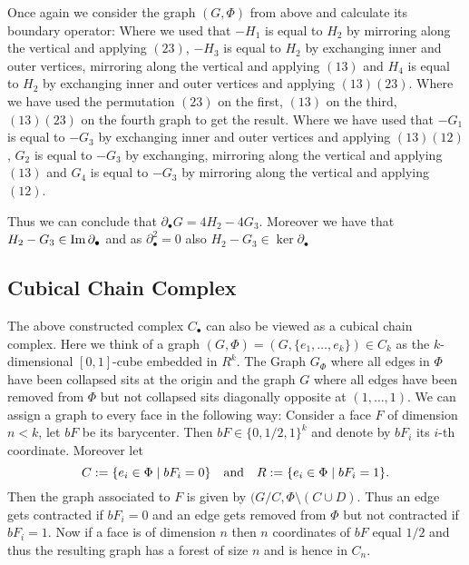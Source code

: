 \begin{eg}
	Once again we consider the graph $(G,\Phi)$ from above and calculate its boundary operator:
	Where we used that $-H_{1}$ is equal to $H_{2}$ by mirroring along the vertical and applying $(2 3)$,
	$-H_{3}$ is equal to $H_2$ by exchanging inner and outer vertices, mirroring along the vertical and applying $(1 3)$ and
	$H_{4}$ is equal to $H_{2}$ by exchanging inner and outer vertices and applying $(1 3)(2 3)$.
	Where we have used the permutation $(2 3)$ on the first,  $(1 3)$ on the third, $(1 3)(2 3)$ on the fourth graph to get the result.
	Where we have used that $-G_{1}$ is equal to $-G_{3}$ by exchanging inner and outer vertices and applying $(1 3)(1 2)$,
	$G_{2}$ is equal to $-G_{3}$ by exchanging, mirroring along the vertical and applying $(1 3)$ and
	$G_{4}$ is equal to $-G_{3}$ by mirroring along the vertical and applying $(1 2)$. 

	Thus we can conclude that $\partial_{\bullet} G = 4 H_2 - 4 G_3$. Moreover we have that $H_2 - G_3 \in \operatorname{Im} \partial_{\bullet}$ and 
	as $\partial_{\bullet}^2=0$ also $H_2 - G_3 \in \ker \partial_{\bullet}$
\end{eg}

\subsection{Cubical Chain Complex}
The above constructed complex $C_{\bullet}$ can also be viewed as a cubical chain complex.
Here we think of a graph $(G,\Phi) = (G, \{e_1,\ldots,e_{k}\})  \in C_{k}$ as the $k$-dimensional $[0,1]$-cube embedded in $R^{k}$.
The Graph $G_{\Phi}$ where all edges in  $\Phi$ have been collapsed sits at the origin and the graph $G$ where all edges have been removed from  $\Phi$ but not collapsed
sits diagonally opposite at  $(1,\ldots,1)$.
We can assign a graph to every face in the following way:
Consider a face $F$ of dimension $n < k$, let $bF$ be its barycenter. Then $bF \in \{0,1 / 2, 1\}^{k}$ and denote by $bF_{i}$ its $i$-th coordinate.
Moreover let
\[
	C := \{e_{i} \in \Phi \mid bF_{i} = 0\} \qq{and} R := \{e_{i} \in \Phi \mid bF_{i} = 1\}  
.\] 
Then the graph associated to $F$ is given by $(G / C, \Phi \setminus (C \cup D)$.
Thus an edge gets contracted if $bF_{i} = 0$ and an edge gets removed from $\Phi$ but not contracted if $bF_{i} = 1$.
Now if a face is of dimension $n$ then $n$ coordinates of $bF$ equal  $1 / 2$ and thus the resulting graph has a forest of size $n$ and is hence in $C_{n}$.

